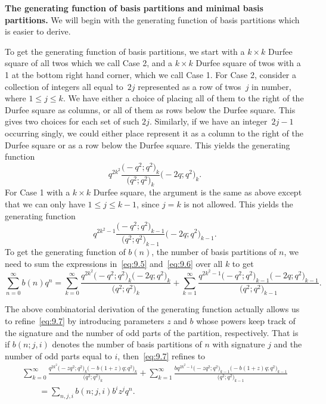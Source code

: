 \documentclass[pdftex]{sigma}
\numberwithin{equation}{section}
\theoremstyle{definition}
\begin{document}
{\bf The generating function of basis partitions and minimal basis
partitions.}
We will begin with the generating function of basis partitions which is
easier to derive.

To get the generating function of basis partitions,
we start with a $k\times k$ Durfee square of all twos which we call Case 2,
and a $k\times k$ Durfee square of twos with a 1 at the bottom right hand
corner, which we call Case 1. For Case 2, consider a collection of integers
all equal to~$2j$ represented as a row of twos~$j$ in number,
where $1\le j\le k$. We have
either a choice of placing all of them to the right of the Durfee square as
columns, or all of them as rows below the Durfee square. This gives two choices
for each set of such $2j$. Similarly, if we have an integer~${2j-1}$ occurring
singly, we could either place represent it as a column to the right of the
Durfee square or as a row below the Durfee square. This yields the generating
function
\begin{equation}
q^{2k^2}\frac{\bigl(-q^2;q^2\bigr)_k}{\bigl(q^2;q^2\bigr)_k} \bigl(-2q;q^2\bigr)_k.\label{eq:9.5}
\end{equation}
For Case 1 with a $k\times k$ Durfee square, the argument is the same as above
except that we can only have $1\le j\le k-1$, since $j=k$ is not allowed. This
yields the generating function
\begin{equation}
q^{2k^2-1}\frac{\bigl(-q^2;q^2\bigr)_{k-1}}{\bigl(q^2;q^2\bigr)_{k-1}} \bigl(-2q;q^2\bigr)_{k-1}.\label{eq:9.6}
\end{equation}
To get the generating function of $b(n)$, the number of basis partitions of
$n$, we need to sum the expressions in~\eqref{eq:9.5} and~\eqref{eq:9.6} over all $k$ to get
\begin{equation}
\sum^{\infty}_{n=0}b(n)q^n=
\sum^{\infty}_{k=0}\frac{q^{2k^2}\bigl(-q^2;q^2\bigr)_k\bigl(-2q;q^2\bigr)_k}{\bigl(q^2;q^2\bigr)_k}
+\sum^{\infty}_{k=1}\frac{q^{2k^2-1}\bigl(-q^2;q^2\bigr)_{k-1}\bigl(-2q;q^2\bigr)_{k-1}}{\bigl(q^2;q^2\bigr)_{k-1}}.
\label{eq:9.7}
\end{equation}

The above combinatorial derivation of the generating function actually allows
us to refine~\eqref{eq:9.7} by introducing parameters $z$ and $b$ whose powers keep
track of the signature and the number of odd parts of the partition,
respectively. That is if $b(n;j,i)$ denotes the number of basis partitions of
$n$ with signature $j$ and the number of odd parts equal to $i$, then~\eqref{eq:9.7}
refines to
\begin{gather}
\sum^{\infty}_{k=0}\frac{q^{2k^2}\bigl(-zq^2;q^2\bigr)_k\bigl(-b(1+z)q;q^2\bigr)_k}{\bigl(q^2;q^2\bigr)_k}
+\sum^{\infty}_{k=1}\frac{bq^{2k^2-1}\bigl(-zq^2;q^2\bigr)_{k-1}\bigl(-b(1+z)q;q^2\bigr)_{k-1}}
{\bigl(q^2;q^2\bigr)_{k-1}}
\nonumber\\
\qquad{}=\sum_{n,j,i}b(n;j,i)b^iz^jq^n.\label{eq:9.8}
\end{gather}
\end{document}
